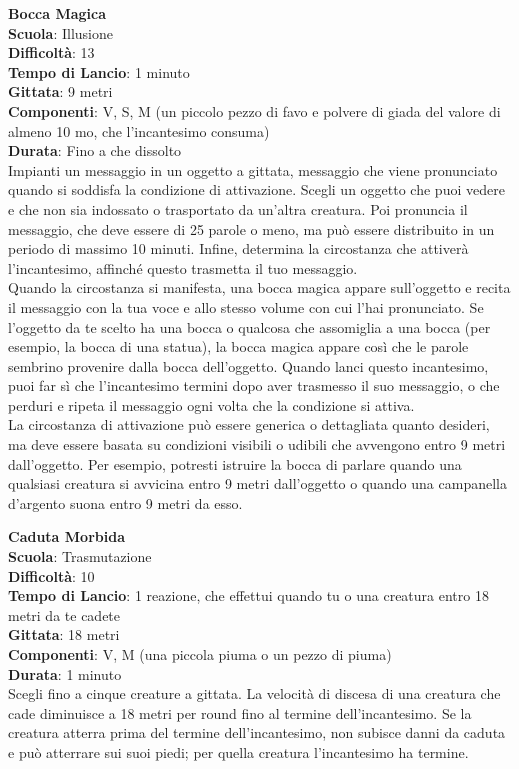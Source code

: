\begin{multicols}{2}
\medskip\textbf{Bocca Magica}\\
\textbf{Scuola}: Illusione\\
\textbf{Difficoltà}: 13\\
\textbf{Tempo di Lancio}: 1 minuto\\
\textbf{Gittata}: 9 metri\\
\textbf{Componenti}: V, S, M (un piccolo pezzo di favo e polvere di giada del valore di almeno 10 mo, che l'incantesimo consuma)\\
\textbf{Durata}: Fino a che dissolto\\
Impianti un messaggio in un oggetto a gittata, messaggio che viene pronunciato quando si soddisfa la condizione di attivazione. Scegli un oggetto che puoi vedere e che non sia indossato o trasportato da un'altra creatura. Poi pronuncia il messaggio, che deve essere di 25 parole o meno, ma può essere distribuito in un periodo di massimo 10 minuti. Infine, determina la circostanza che attiverà l'incantesimo, affinché questo trasmetta il tuo messaggio.\\
Quando la circostanza si manifesta, una bocca magica appare sull'oggetto e recita il messaggio con la tua voce e allo stesso volume con cui l'hai pronunciato. Se l'oggetto da te scelto ha una bocca o qualcosa che assomiglia a una bocca (per esempio, la bocca di una statua), la bocca magica appare così che le parole sembrino provenire dalla bocca dell'oggetto. Quando lanci questo incantesimo, puoi far sì che l'incantesimo termini dopo aver trasmesso il suo messaggio, o che perduri e ripeta il messaggio ogni volta che la condizione si attiva.\\
La circostanza di attivazione può essere generica o dettagliata quanto desideri, ma deve essere basata su condizioni visibili o udibili che avvengono entro 9 metri dall'oggetto. Per esempio, potresti istruire la bocca di parlare quando una qualsiasi creatura si avvicina entro 9 metri dall'oggetto o quando una campanella d'argento suona entro 9 metri da esso.

\medskip\textbf{Caduta Morbida}\\
\textbf{Scuola}: Trasmutazione\\
\textbf{Difficoltà}: 10\\
\textbf{Tempo di Lancio}: 1 reazione, che effettui quando tu o una creatura entro 18 metri da te cadete\\
\textbf{Gittata}: 18 metri\\
\textbf{Componenti}: V, M (una piccola piuma o un pezzo di piuma)\\
\textbf{Durata}: 1 minuto\\
Scegli fino a cinque creature a gittata. La velocità di discesa di una creatura che cade diminuisce a 18 metri per round fino al termine dell'incantesimo. Se la creatura atterra prima del termine dell'incantesimo, non subisce danni da caduta e può atterrare sui suoi piedi; per quella creatura l'incantesimo ha termine.\\


\end{multicols}
